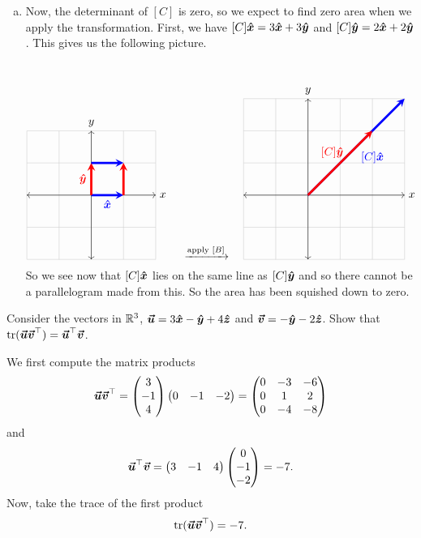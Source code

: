 \documentclass[12pt]{article} %
\begin{document}
\begin{solution}
\begin{enumerate}[(a)]
        \item Now, the determinant of $[C]$ is zero, so we expect to find zero area when we apply the transformation. First, we have $[C]\boldsymbol{\hat{x}} = 3\boldsymbol{\hat{x}} + 3\boldsymbol{\hat{y}}$ and $[C]\boldsymbol{\hat{y}} = 2\boldsymbol{\hat{x}} + 2\boldsymbol{\hat{y}}$.  This gives us the following picture.
        \[
        \begin{tikzpicture}
        \draw[thin,gray!40] (-2,-2) grid (2,2);
        \draw[<->] (-2,0)--(2,0) node[right]{$x$};
        \draw[<->] (0,-2)--(0,2) node[above]{$y$};
        \draw[line width=2pt,blue,-stealth](0,0)--(1,0) node[anchor=north] at (.5,0){$\xhat$};
        \draw[line width=2pt, red, -stealth](0,0)--(0,1) node[anchor=east] at (0,.5){$\yhat$};
        \draw[line width=2pt, blue, -stealth](0,1)--(1,1) node[anchor=north] at (1,4){};
        \draw[line width=2pt, red, -stealth](1,0)--(1,1) node[anchor=south] at (1,4){};
        \end{tikzpicture}
        \quad \xrightarrow{\textrm{apply }[B]} \quad
        \begin{tikzpicture}
        \draw[thin,gray!40] (-2,-2) grid (3,3);
        \draw[<->] (-2,0)--(3,0) node[right]{$x$};
        \draw[<->] (0,-2)--(0,3) node[above]{$y$};
        \draw[line width=2pt, blue, -stealth](0,0)--(3,3) node[anchor=north] at (2,1.5){$[C]\xhat$};
        \draw[line width=2pt,red,-stealth](0,0)--(2,2) node[anchor=south] at (.75,1){$[C]\yhat$};
        \end{tikzpicture}
        \]
        So we see now that $[C]\boldsymbol{\hat{x}}$ lies on the same line as $[C]\boldsymbol{\hat{y}}$ and so there cannot be a parallelogram made from this. So the area has been squished down to zero.
    \end{enumerate}
\end{solution}

\newpage
\begin{problem}
Consider the vectors in $\mathbb{R}^3$, $\boldsymbol{\boldsymbol{\vec{u}}}=3\boldsymbol{\hat{x}} - \boldsymbol{\hat{y}} + 4\boldsymbol{\hat{z}}$ and $\boldsymbol{\boldsymbol{\vec{v}}}=-\boldsymbol{\hat{y}} - 2\boldsymbol{\hat{z}}$.  Show that $\mathrm{tr}(\boldsymbol{\boldsymbol{\vec{u}}} \boldsymbol{\boldsymbol{\vec{v}}}^\top) = \boldsymbol{\boldsymbol{\vec{u}}}^\top \boldsymbol{\boldsymbol{\vec{v}}}$.
\end{problem}
\begin{solution}
We first compute the matrix products
\[
\boldsymbol{\boldsymbol{\vec{u}}} \boldsymbol{\boldsymbol{\vec{v}}}^\top = \begin{pmatrix} 3 \\ -1 \\ 4 \end{pmatrix} \begin{pmatrix} 0 & -1 & -2 \end{pmatrix} = \begin{pmatrix} 0 & -3 & -6 \\ 0 & 1 & 2 \\ 0 & -4 & -8 \end{pmatrix}
\]
and
\[
\boldsymbol{\boldsymbol{\vec{u}}}^\top \boldsymbol{\boldsymbol{\vec{v}}}= \begin{pmatrix} 3 & -1 & 4 \end{pmatrix} \begin{pmatrix} 0 \\ -1 \\ -2 \end{pmatrix} = -7.
\]
Now, take the trace of the first product
\[
\mathrm{tr}(\boldsymbol{\boldsymbol{\vec{u}}} \boldsymbol{\boldsymbol{\vec{v}}}^\top) = -7.
\]
\end{solution}
\end{document}
